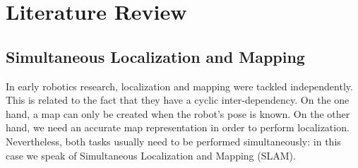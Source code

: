 \section{Literature Review}

\subsection{Simultaneous Localization and Mapping}

In early robotics research, localization and mapping were tackled
independently.
This is related to the fact that they have a cyclic inter-dependency.
On the one hand, a map can only be created when the robot’s pose is known.
On the other hand, we need an accurate map representation in order to
perform localization.
Nevertheless, both tasks usually need to be performed simultaneously:
in this case we speak of Simultaneous Localization and Mapping (SLAM).

